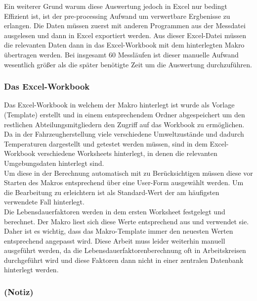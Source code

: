 Ein weiterer Grund warum diese Auswertung jedoch in Excel nur bedingt Effizient ist, ist der pre-processing Aufwand um verwertbare Ergbenisse zu erlangen. Die Daten müssen zuerst mit anderen Programmen aus der Messdatei ausgelesen und dann in Excel exportiert werden. Aus dieser Excel-Datei müssen die relevanten Daten dann in das Excel-Workbook mit dem hinterlegten Makro übertragen werden. Bei insgesamt 60 Messläufen ist dieser manuelle Aufwand wesentlich größer als die später benötigte Zeit um die Auswertung durchzuführen.\\

\subsubsection{Das Excel-Workbook}
\label{Workbook}

Das Excel-Workbook in welchem der Makro hinterlegt ist wurde als Vorlage (Template) erstellt und in einem entsprechendem Ordner abgespeichert um den restlichen Abteilungsmitgliedern den Zugriff auf das Workbook zu ermöglichen.\\

Da in der Fahrzeugherstellung viele verschiedene Umweltzustände und dadurch Temperaturen dargestellt und getestet werden müssen, sind in dem Excel-Workbook verschiedene Worksheets hinterlegt, in denen die relevanten Umgebungsdaten hinterlegt sind. \\
Um diese in der Berechnung automatisch mit zu Berücksichtigen müssen diese vor Starten des Makros entsprechend über eine User-Form ausgewählt werden. Um die Bearbeitung zu erleichtern ist als Standard-Wert der am häufigsten verwendete Fall hinterlegt. \\

Die Lebensdauerfaktoren werden in dem ersten Worksheet festgelegt und berechnet. Der Makro liest sich diese Werte entsprechend aus und verwendet sie. Daher ist es wichtig, dass das Makro-Template immer den neuesten Werten entsprechend angepasst wird. Diese Arbeit muss leider weiterhin manuell ausgeführt werden, da die Lebensdauerfaktorenberechnung oft in Arbeitskreisen durchgeführt wird und diese Faktoren dann nicht in einer zentralen Datenbank hinterlegt werden. \\

\newpage
\subsubsection*{(Notiz)}
\label{Note1}


